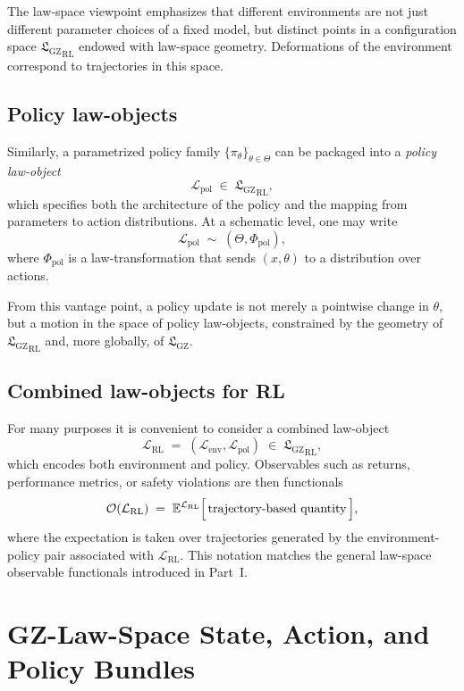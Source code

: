 \documentclass[11pt]{book}
\newcommand{\GZLS}{\ensuremath{\mathfrak{L}_{\mathrm{GZ}}}}
\theoremstyle{plain}
\theoremstyle{definition}
\theoremstyle{remark}
\begin{document}
The law-space viewpoint emphasizes that different environments are
not just different parameter choices of a fixed model, but distinct
points in a configuration space ${\GZLS}_{\mathrm{RL}}$ endowed with
law-space geometry. Deformations of the environment correspond to
trajectories in this space.

\subsection*{Policy law-objects}

Similarly, a parametrized policy family
$\{\pi_\theta\}_{\theta \in \Theta}$ can be packaged into a
\emph{policy law-object}
\[
   \mathcal{L}_{\mathrm{pol}} \;\in\; {\GZLS}_{\mathrm{RL}},
\]
which specifies both the architecture of the policy and the mapping
from parameters to action distributions. At a schematic level, one
may write
\[
   \mathcal{L}_{\mathrm{pol}} \;\sim\; (\Theta, \Phi_{\mathrm{pol}}),
\]
where $\Phi_{\mathrm{pol}}$ is a law-transformation that sends
$(x,\theta)$ to a distribution over actions.

From this vantage point, a policy update is not merely a pointwise
change in $\theta$, but a motion in the space of policy law-objects,
constrained by the geometry of ${\GZLS}_{\mathrm{RL}}$ and, more
globally, of $\GZLS$.

\subsection*{Combined law-objects for RL}

For many purposes it is convenient to consider a combined law-object
\[
   \mathcal{L}_{\mathrm{RL}}
   \;=\;
   (\mathcal{L}_{\mathrm{env}}, \mathcal{L}_{\mathrm{pol}})
   \;\in\; {\GZLS}_{\mathrm{RL}},
\]
which encodes both environment and policy. Observables such as
returns, performance metrics, or safety violations are then
functionals
\[
   \mathcal{O}(\mathcal{L}_{\mathrm{RL}})
   \;=\;
   \mathbb{E}^{\mathcal{L}_{\mathrm{RL}}}\Bigl[\,\text{trajectory-based
   quantity}\,\Bigr],
\]
where the expectation is taken over trajectories generated by the
environment-policy pair associated with $\mathcal{L}_{\mathrm{RL}}$.
This notation matches the general law-space observable functionals
introduced in Part~I.

\section{GZ-Law-Space State, Action, and Policy Bundles}
\label{sec:lawspace-state-action-policy}
\end{document}
